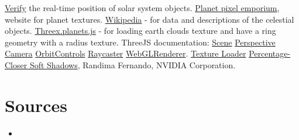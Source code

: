 \documentclass{article}
\begin{document}
\begin{thebibliography}{99}
 \href{https://theskylive.com/3dsolarsystem}{Verify} the real-time position of solar system objects.
 \href{http://planetpixelemporium.com/planets.html}{Planet pixel emporium}, website for planet textures.
 \href{https://www.wikipedia.org/}{Wikipedia} - for data and descriptions of the celestial objects.
 \href{https://github.com/jeromeetienne/threex.planets/blob/master/threex.planets.js}{Threex.planets.js} - for loading earth clouds texture and have a ring geometry with a radius texture.
 ThreeJS documentation: \href{https://threejs.org/docs/#api/en/scenes/Scene}{Scene}
\href{https://threejs.org/docs/#api/en/cameras/PerspectiveCamera}{Perspective Camera}  \href{https://threejs.org/docs/#examples/en/controls/OrbitControls}{OrbitControls} \href{https://threejs.org/docs/#api/en/core/Raycaster}{Raycaster} \href{https://threejs.org/docs/#api/en/renderers/WebGLRenderer}{WebGLRenderer}.
\href{https://threejs.org/docs/#api/en/loaders/TextureLoader}{Texture Loader}
 \href{http://developer.download.nvidia.com/shaderlibrary/docs/shadow_PCSS.pdf}{Percentage-Closer Soft Shadows}, Randima Fernando, NVIDIA Corporation.
\end{thebibliography}


\appendix
\appendixpage
\addappheadtotoc
\section{Sources}
\begin{itemize}
	\item 
	
\end{itemize}
\end{document}
